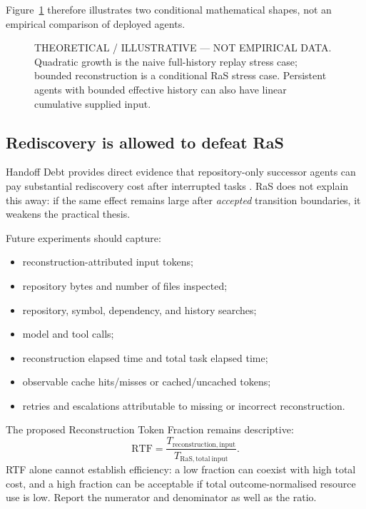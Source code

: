 Figure~\ref{fig:context-growth} therefore illustrates two conditional mathematical shapes, not an empirical comparison of deployed agents.

\begin{figure}[htbp]
\centering

\caption{THEORETICAL / ILLUSTRATIVE --- NOT EMPIRICAL DATA. Quadratic growth is the naive full-history replay stress case; bounded reconstruction is a conditional RaS stress case. Persistent agents with bounded effective history can also have linear cumulative supplied input.}
\label{fig:context-growth}
\end{figure}

\subsection{Rediscovery is allowed to defeat RaS}

Handoff Debt provides direct evidence that repository-only successor agents can pay substantial rediscovery cost after interrupted tasks \citep{kc2026handoff}. RaS does not explain this away: if the same effect remains large after \emph{accepted} transition boundaries, it weakens the practical thesis.

Future experiments should capture:
\begin{itemize}
    \item reconstruction-attributed input tokens;
    \item repository bytes and number of files inspected;
    \item repository, symbol, dependency, and history searches;
    \item model and tool calls;
    \item reconstruction elapsed time and total task elapsed time;
    \item observable cache hits/misses or cached/uncached tokens;
    \item retries and escalations attributable to missing or incorrect reconstruction.
\end{itemize}

The proposed Reconstruction Token Fraction remains descriptive:
\begin{equation}
\mathrm{RTF}=
\frac{T_{\mathrm{reconstruction,input}}}
{T_{\mathrm{RaS,total~input}}}.
\label{eq:rtf}
\end{equation}
RTF alone cannot establish efficiency: a low fraction can coexist with high total cost, and a high fraction can be acceptable if total outcome-normalised resource use is low. Report the numerator and denominator as well as the ratio.

